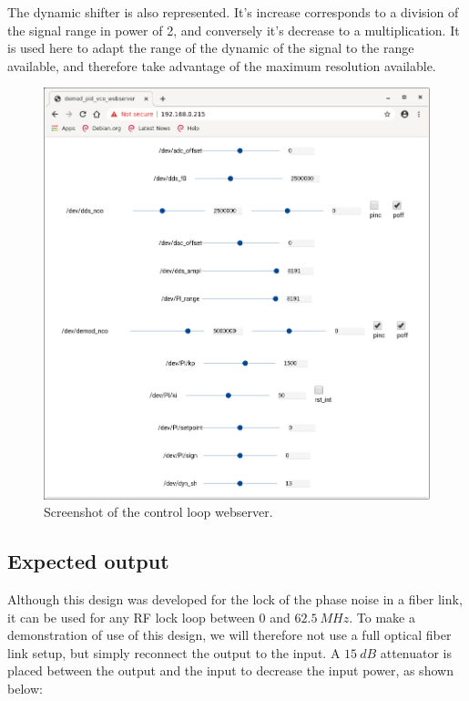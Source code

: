 \documentclass[12pt,oneside]{article}
\begin{document}
The dynamic shifter is also represented. It's increase corresponds to a division of the signal range in power of 2, and conversely it's decrease to a multiplication. It is used here to adapt the range of the dynamic of the signal to the range available, and therefore take advantage of the maximum resolution available.

\begin{figure}[h!tb]
	\begin{center}
		\vspace{0.5cm}
		\includegraphics[width=15cm,trim={0cm 0cm 0cm 0cm}, clip]{webserver/2020-02-11-154130_889x946_scrot.png}
		\caption{Screenshot of the control loop webserver.}
		\label{fig:pll_webserver}
	\end{center}
\end{figure}

\newpage

\subsection{Expected output}

Although this design was developed for the lock of the phase noise in a fiber link, it can be used for any RF lock loop between $0$ and $62.5~MHz$. To make a demonstration of use of this design, we will therefore not use a full optical fiber link setup, but simply reconnect the output to the input. A $15~dB$ attenuator is placed between the output and the input to decrease the input power, as shown below: 
\end{document}
